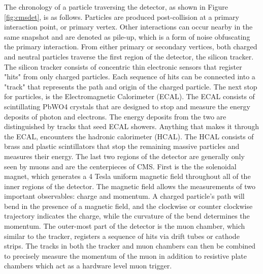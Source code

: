 The chronology of a particle traversing the detector, as shown in Figure \ref{fig:cmsdet}, is as follows. Particles are produced post-collision at a primary interaction point, or primary vertex. Other interactions can occur nearby in the same snapshot and are denoted as pile-up, which is a form of noise obfuscating the primary interaction. From either primary or secondary vertices, both charged and neutral particles traverse the first region of the detector, the silicon tracker. The silicon tracker consists of concentric thin electronic sensors that register "hits" from only charged particles. Each sequence of hits can be connected into a "track" that represents the path and origin of the charged particle.  The next stop for particles, is the Electromagnetic Calorimeter (ECAL). The ECAL consists of scintillating PbWO4 crystals that are designed to stop and measure the energy deposits of photon and electrons. The energy deposits from the two  are distinguished by tracks that seed ECAL showers. Anything that makes it through the ECAL, encounters the hadronic calorimeter (HCAL). The HCAL consists of brass and plastic scintillators that stop the remaining massive particles and measures their energy. The last two regions of the detector are generally only seen by muons and are the centerpieces of CMS. First is the the solenoidal magnet, which generates a 4 Tesla uniform magnetic field throughout all of the inner regions of the detector. The magnetic field allows the measurements of two important observables: charge and momentum.  A charged particle's path will bend in the presence of a magnetic field, and the clockwise or counter clockwise trajectory indicates the charge, while the curvature of the bend determines the momentum. The outer-most part of the detector is the muon chamber, which similar to the tracker, registers a sequence of hits via drift tubes or cathode strips. The tracks in both the tracker and muon chambers can then be combined to precisely measure the momentum of the muon in addition to resistive plate chambers which act as a hardware level muon trigger. 




